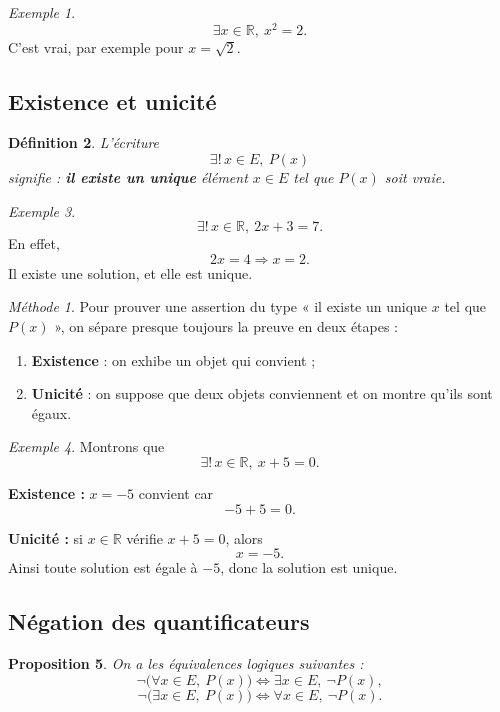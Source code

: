 \documentclass[11pt,a4paper]{article}
\newtheorem{definition}{Définition}[section]
\newtheorem{proposition}[definition]{Proposition}
\theoremstyle{remark}
\newtheorem{exemple}[definition]{Exemple}
\newtheorem*{methode}{Méthode}
\newcommand{\R}{\mathbb{R}}
\begin{document}
\begin{exemple}
\[
\exists x\in\R,\ x^2=2.
\]
C’est vrai, par exemple pour \(x=\sqrt{2}\).
\end{exemple}

\subsection{Existence et unicité}

\begin{definition}
L’écriture
\[
\exists !\,x\in E,\ P(x)
\]
signifie : \textbf{il existe un unique} élément \(x\in E\) tel que \(P(x)\) soit vraie.
\end{definition}

\begin{exemple}
\[
\exists !\,x\in\R,\ 2x+3=7.
\]
En effet,
\[
2x=4 \Longrightarrow x=2.
\]
Il existe une solution, et elle est unique.
\end{exemple}

\begin{methode}
Pour prouver une assertion du type « il existe un unique \(x\) tel que \(P(x)\) », on sépare presque toujours la preuve en deux étapes :
\begin{enumerate}
    \item \textbf{Existence} : on exhibe un objet qui convient ;
    \item \textbf{Unicité} : on suppose que deux objets conviennent et on montre qu’ils sont égaux.
\end{enumerate}
\end{methode}

\begin{exemple}
Montrons que
\[
\exists !\,x\in\R,\ x+5=0.
\]

\textbf{Existence :} \(x=-5\) convient car
\[
-5+5=0.
\]

\textbf{Unicité :} si \(x\in\R\) vérifie \(x+5=0\), alors
\[
x=-5.
\]
Ainsi toute solution est égale à \(-5\), donc la solution est unique.
\end{exemple}

\subsection{Négation des quantificateurs}

\begin{proposition}
On a les équivalences logiques suivantes :
\[
\neg\big(\forall x\in E,\ P(x)\big)
\Longleftrightarrow
\exists x\in E,\ \neg P(x),
\]
\[
\neg\big(\exists x\in E,\ P(x)\big)
\Longleftrightarrow
\forall x\in E,\ \neg P(x).
\]
\end{proposition}
\end{document}
